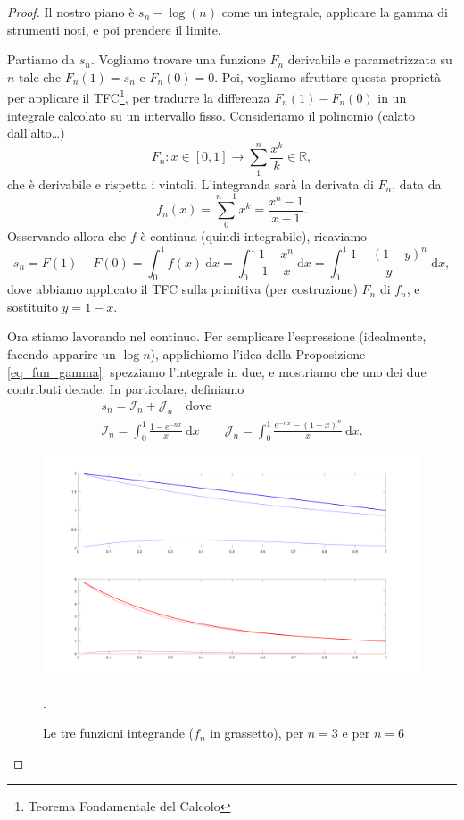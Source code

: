 \begin{proof}
	Il nostro piano è $s_n - \log(n)$ come un integrale, applicare la gamma di strumenti noti, e poi prendere il limite.

	Partiamo da $s_n$. 
	Vogliamo trovare una funzione $F_n$ derivabile e parametrizzata su $n$ tale che $F_n(1)=s_n$ e $F_n(0)=0$. 
	Poi, vogliamo sfruttare questa proprietà per applicare il TFC\footnote{Teorema Fondamentale del Calcolo}, per tradurre la differenza $F_n(1)-F_n(0)$ in un integrale calcolato su un intervallo fisso.
	Consideriamo il polinomio (calato dall'alto\dots)
	\begin{equation*}
		F_n : x \in [0,1] \to
		\sum^n_1 \frac{x^k}{k} \in \mathbb{R},
	\end{equation*}
	che è derivabile e rispetta i vintoli.
	L'integranda sarà la derivata di $F_n$, data da
	\begin{equation}
		\label{res1}
		f_n(x)= 
		\sum^{n-1}_0x^k= 
		\frac{x^n-1}{x-1}.
	\end{equation}	
	Osservando allora che $f$ è continua (quindi integrabile), ricaviamo
	\begin{equation*}
		s_n=
		F(1)-F(0)= 
		\int^1_0f(x) \: \mathrm{d}x= 
		\int^1_0 \frac{1-x^n}{1-x} \: \mathrm{d}x= 
		\int^1_0 \frac{1-(1-y)^n}{y} \: \mathrm{d}x,
	\end{equation*}	
	dove abbiamo applicato il TFC sulla primitiva (per costruzione) $F_n$ di $f_n$, e sostituito $y=1-x$. 
	
	Ora stiamo lavorando nel continuo. Per semplicare l'espressione (idealmente, facendo apparire un $\log n$), applichiamo l'idea della Proposizione \ref{eq_fun_gamma}: spezziamo l'integrale in due, e mostriamo che uno dei due contributi decade.
	In particolare, definiamo
	\begin{gather*}
		s_n = 
		\mathcal{I}_n + \mathcal{J}_n \quad \text{dove} \\
		\mathcal{I}_n = \int^1_0 \frac{1-e^{-nx}}{x} \: \mathrm{d} x 
		\qquad 
		\mathcal{J}_n= \int^1_0 \frac{e^{-nx}-(1-x)^n}{x} \: \mathrm{d} x.
	\end{gather*}
	
	\begin{figure}
		\centering
		\includegraphics[width=.9\textwidth]{assets/eulero_mascheroni_choice.png}
		\caption{Le tre funzioni integrande ($f_n$ in grassetto), per $n=3$ e per $n=6$}.		
	\end{figure}


\end{proof}
